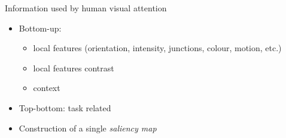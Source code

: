\documentclass[xcolor=pdftex,dvipsnames,table,mathserif]{beamer}
\begin{document}
\begin{frame}{Information used by human visual attention}

  \begin{itemize}
  \item Bottom-up:
    \begin{itemize}
    \item local features (orientation, intensity, junctions, colour, motion, etc.)
    \item local features contrast
    \item context
    \end{itemize}
\item Top-bottom: task related
\item Construction of a single \textit{saliency map}

  \end{itemize}

\end{frame}
\end{document}

